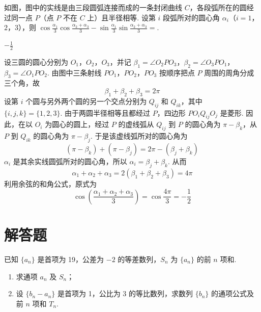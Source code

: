 \begin{problem}
如图，图中的实线是由三段圆弧连接而成的一条封闭曲线 \(C\)，各段弧所在的圆经过同一点 \(P\)（点 \(P\) 不在 \(C\) 上）且半径相等. 设第 \(i\) 段弧所对的圆心角 \(\alpha_i\)（\(i = 1\)，\(2\)，\(3\)），则 \(\cos \frac{\alpha_1}{3} \cos \frac{\alpha_2 + \alpha_3}{3} - \sin \frac{\alpha_1}{3} \sin \frac{\alpha_2 + \alpha_3}{3} =\)\fillinblank{}.

\end{problem}

\begin{answer}
\(-\frac{1}{2}\)
\end{answer}

\begin{solution}
设三圆的圆心分别为 \(O_1\)，\(O_2\)，\(O_3\)，并记 \(\beta_1=\angle O_2PO_3\)，\(\beta_2=\angle O_3PO_1\)，\(\beta_3=\angle O_1PO_2\). 由图中三条射线 \(PO_1\)，\(PO_2\)，\(PO_3\) 按顺序把点 \(P\) 周围的周角分成三个角，故
\[
\beta_1+\beta_2+\beta_3=2\pi
\]
设第 \(i\) 个圆与另外两个圆的另一个交点分别为 \(Q_{ij}\) 和 \(Q_{ik}\)，其中 \(\{i,j,k\}=\{1,2,3\}\). 由于两圆半径相等且都经过 \(P\)，四边形 \(P O_i Q_{ij} O_j\) 是菱形. 因此，在以 \(O_i\) 为圆心的圆上，经过 \(P\) 的虚线弧从 \(Q_{ij}\) 到 \(P\) 的圆心角为 \(\pi-\beta_k\)，从 \(P\) 到 \(Q_{ik}\) 的圆心角为 \(\pi-\beta_j\). 于是该虚线弧所对的圆心角为
\[
(\pi-\beta_k)+(\pi-\beta_j)=2\pi-(\beta_j+\beta_k)
\]
\(\alpha_i\) 是其余实线圆弧所对的圆心角，所以 \(\alpha_i=\beta_j+\beta_k\). 从而
\[
\alpha_1+\alpha_2+\alpha_3=2(\beta_1+\beta_2+\beta_3)=4\pi
\]
利用余弦的和角公式，原式为
\[
\cos\left(\frac{\alpha_1+\alpha_2+\alpha_3}{3}\right)=\cos\frac{4\pi}{3}=-\frac{1}{2}
\]
\end{solution}

\section{解答题}

\begin{problem}
已知 \(\{a_n\}\) 是首项为 19，公差为 \(-2\) 的等差数列，\(S_n\) 为 \(\{a_n\}\) 的前 \(n\) 项和.
\begin{enumerate}
\item 求通项 \( a_{n} \) 及 \( S_{n} \)；
\item 设 \( \{b_{n}-a_{n}\} \) 是首项为 1，公比为 3 的等比数列，求数列 \( \{b_{n}\} \) 的通项公式及前 \(n\) 项和 \( T_{n} \).
\end{enumerate}
\end{problem}

